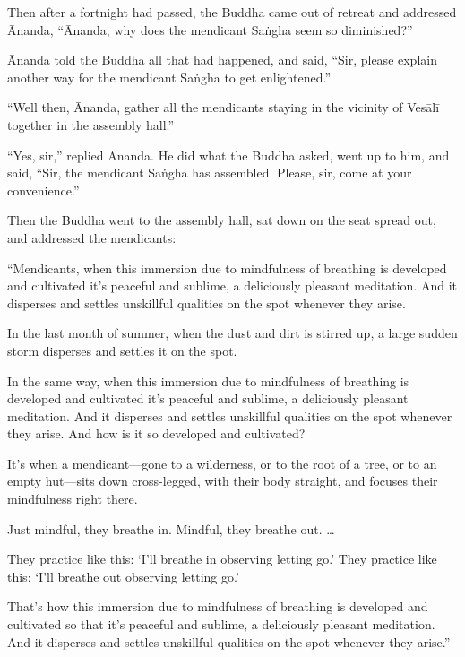 \documentclass[12pt,openany]{book}%
\begin{document}
Then after a fortnight had passed, the Buddha came out of retreat and addressed Ānanda, “Ānanda, why does the mendicant \textsanskrit{Saṅgha} seem so diminished?” 

Ānanda told the Buddha all that had happened, and said, “Sir, please explain another way for the mendicant \textsanskrit{Saṅgha} to get enlightened.” 

“Well then, Ānanda, gather all the mendicants staying in the vicinity of \textsanskrit{Vesālī} together in the assembly hall.” 

“Yes, sir,” replied Ānanda. He did what the Buddha asked, went up to him, and said, “Sir, the mendicant \textsanskrit{Saṅgha} has assembled. Please, sir, come at your convenience.” 

Then the Buddha went to the assembly hall, sat down on the seat spread out, and addressed the mendicants: 

“Mendicants, when this immersion due to mindfulness of breathing is developed and cultivated it’s peaceful and sublime, a deliciously pleasant meditation. And it disperses and settles unskillful qualities on the spot whenever they arise. 

In the last month of summer, when the dust and dirt is stirred up, a large sudden storm disperses and settles it on the spot. 

In the same way, when this immersion due to mindfulness of breathing is developed and cultivated it’s peaceful and sublime, a deliciously pleasant meditation. And it disperses and settles unskillful qualities on the spot whenever they arise. And how is it so developed and cultivated? 

It’s when a mendicant—gone to a wilderness, or to the root of a tree, or to an empty hut—sits down cross-legged, with their body straight, and focuses their mindfulness right there. 

Just mindful, they breathe in. Mindful, they breathe out. … 

They practice like this: ‘I’ll breathe in observing letting go.’ They practice like this: ‘I’ll breathe out observing letting go.’ 

That’s how this immersion due to mindfulness of breathing is developed and cultivated so that it’s peaceful and sublime, a deliciously pleasant meditation. And it disperses and settles unskillful qualities on the spot whenever they arise.” 
\end{document}
